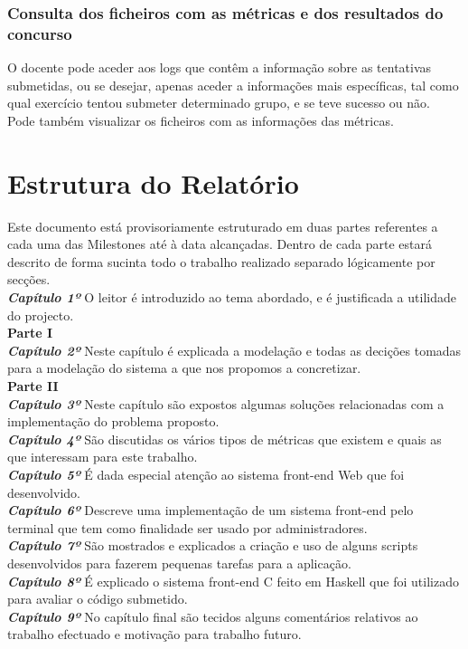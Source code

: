 \subsubsection{Consulta dos ficheiros com as métricas e dos resultados do concurso}
O docente pode aceder aos logs que contêm a informação sobre as tentativas submetidas, ou se desejar, apenas aceder a informações mais específicas, tal como 
qual exercício tentou submeter determinado grupo, e se teve sucesso ou não.\\
Pode também visualizar os ficheiros com as informações das métricas.

\section{Estrutura do Relatório}
Este documento está provisoriamente estruturado em duas partes referentes a cada uma das Milestones até à data alcançadas. Dentro de cada parte estará descrito de forma
sucinta todo o trabalho realizado separado lógicamente por secções.\\

\textbf{\textit{Capítulo 1º}} O leitor é introduzido ao tema abordado, e é justificada a utilidade do projecto.\\

\textbf{Parte I}\\

\textbf{\textit{Capítulo 2º}} Neste capítulo é explicada a modelação e todas as decições tomadas para a modelação do sistema a que nos propomos a concretizar.\\

\textbf{Parte II}\\

\textbf{\textit{Capítulo 3º}} Neste capítulo são expostos algumas soluções relacionadas com a implementação do problema proposto.\\

\textbf{\textit{Capítulo 4º}} São discutidas os vários tipos de métricas que existem e quais as que interessam para este trabalho.\\

\textbf{\textit{Capítulo 5º}} É dada especial atenção ao sistema front-end Web que foi desenvolvido.\\

\textbf{\textit{Capítulo 6º}} Descreve uma implementação de um sistema front-end pelo terminal que tem como finalidade ser usado por administradores.\\

\textbf{\textit{Capítulo 7º}} São mostrados e explicados a criação e uso de alguns scripts desenvolvidos para fazerem pequenas tarefas para a aplicação.\\

\textbf{\textit{Capítulo 8º}} É explicado o sistema front-end C feito em Haskell que foi utilizado para avaliar o código submetido.\\

\textbf{\textit{Capítulo 9º}} No capítulo final são tecidos alguns comentários relativos ao trabalho efectuado e motivação para trabalho futuro.\\

